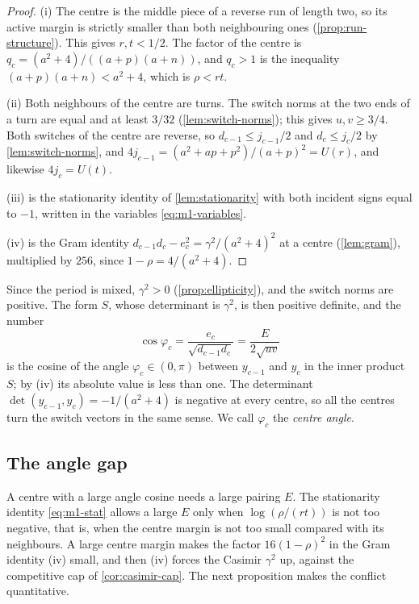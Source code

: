 \begin{proof}
  (i) The centre is the middle piece of a reverse run of length two, so its active margin is
  strictly smaller than both neighbouring ones (\cref{prop:run-structure}). This gives
  $r,t<1/2$. The factor of the centre is $q_c=(a^2+4)/((a+p)(a+n))$, and $q_c>1$ is the
  inequality $(a+p)(a+n)<a^2+4$, which is $\rho<rt$.

  (ii) Both neighbours of the centre are turns. The switch norms at the two ends of a turn are
  equal and at least $3/32$ (\cref{lem:switch-norms}); this gives $u,v\ge 3/4$. Both switches of
  the centre are reverse, so $d_{c-1}\le j_{c-1}/2$ and $d_c\le j_c/2$ by \cref{lem:switch-norms},
  and $4j_{c-1}=(a^2+ap+p^2)/(a+p)^2=U(r)$, and likewise $4j_c=U(t)$.

  (iii) is the stationarity identity of \cref{lem:stationarity} with both incident signs equal to
  $-1$, written in the variables \eqref{eq:m1-variables}.

  (iv) is the Gram identity $d_{c-1}d_c-e_c^2=\gamma^2/(a^2+4)^2$ at a centre (\cref{lem:gram}),
  multiplied by $256$, since $1-\rho=4/(a^2+4)$.
\end{proof}

Since the period is mixed, $\gamma^2>0$ (\cref{prop:ellipticity}), and the switch norms are
positive. The form $S$, whose determinant is $\gamma^2$, is then positive definite, and the number
\[
  \cos\varphi_c=\frac{e_c}{\sqrt{d_{c-1}d_c}}=\frac{E}{2\sqrt{uv}}
\]
is the cosine of the angle $\varphi_c\in(0,\pi)$ between $y_{c-1}$ and $y_c$ in the inner product
$S$; by (iv) its absolute value is less than one. The determinant $\det(y_{c-1},y_c)=-1/(a^2+4)$
is negative at every centre, so all the centres turn the switch vectors in the same sense. We call
$\varphi_c$ the \emph{centre angle}.

\subsection{The angle gap}

A centre with a large angle cosine needs a large pairing $E$. The stationarity identity
\eqref{eq:m1-stat} allows a large $E$ only when $\log(\rho/(rt))$ is not too negative, that is,
when the centre margin is not too small compared with its neighbours. A large centre margin makes
the factor $16(1-\rho)^2$ in the Gram identity (iv) small, and then (iv) forces the Casimir
$\gamma^2$ up, against the competitive cap of \cref{cor:casimir-cap}. The next proposition makes
the conflict quantitative.

